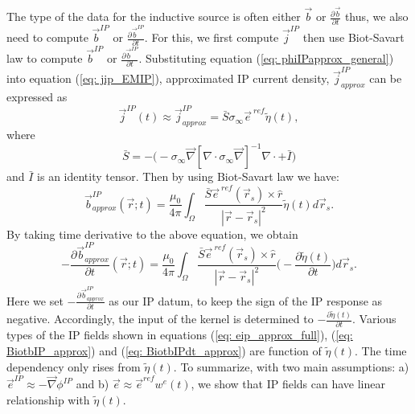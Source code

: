 \documentclass[a4paper, 11pt]{article}
\renewcommand{\div}{\nabla\cdot}
\newcommand{\grad}{\vec \nabla}
\newcommand{\siginf}{\sigma_\infty}
\renewcommand {\j}  { {\vec j} }
\renewcommand {\b}  { {\vec b} }
\newcommand {\e}  { {\vec e} }
\newcommand{\peta}{\tilde{\eta}}
\newcommand{\eref}{\e^{\ ref}}
\begin{document}
The type of the data for the inductive source is often either $\b$ or $\frac{\partial \b}{\partial t}$ thus, we also need to compute $\b^{IP}$ or $\frac{\partial \b^{IP}}{\partial t}$.
For this, we first compute $\j^{IP}$ then use Biot-Savart law to compute $\b^{IP}$ or $\frac{\partial \b^{IP}}{\partial t}$. 
Substituting equation (\ref{eq: phiIPapprox_general}) into equation (\ref{eq: jip_EMIP}), approximated IP current density, $\j^{IP}_{approx}$ can be expressed as
\begin{equation}
  \j^{IP}(t) \approx \j^{IP}_{approx} = \bar{S}\siginf\eref\peta(t),
  \label{eq: jip_approx}
\end{equation}
where
\begin{equation}
  \bar{S} = -\Big(-\siginf\grad[\div \siginf\grad]^{-1}\div+\bar{I}\Big)
\end{equation}
and $\bar{I}$ is an identity tensor. Then by using Biot-Savart law we have:
\begin{equation}
  \b^{IP}_{approx}(\vec{r}; t) = \frac{\mu_0}{4\pi}\int_{\Omega}  \frac{\bar{S}\eref(\vec{r}_s)\times\hat{r}}{|\vec{r}-\vec{r}_s|^2}\peta(t)d\vec{r}_s.
  \label{eq: BiotbIP_approx}
\end{equation}
By taking time derivative to the above equation, we obtain
\begin{equation}
  -\frac{\partial\b^{IP}_{approx}}{\partial t}(\vec{r}; t) = \frac{\mu_0}{4\pi} \int_{\Omega}  \frac{\bar{S}\eref(\vec{r}_s)\times\hat{r}}{|\vec{r}-\vec{r}_s|^2} \Big( -\frac{\partial \peta(t)}{\partial t} \Big) d\vec{r}_s.
  \label{eq: BiotbIPdt_approx}
\end{equation}
Here we set $-\frac{\partial \b^{IP}_{approx}}{\partial t}$ as our IP datum, to keep the sign of the IP response as negative. 
Accordingly, the input of the kernel is determined to $-\frac{\partial \peta(t)}{\partial t}$. 
Various types of the IP fields shown in equations (\ref{eq: eip_approx_full}), (\ref{eq: BiotbIP_approx}) and (\ref{eq: BiotbIPdt_approx}) are function of $\peta(t)$.
The time dependency only rises from $\peta(t)$. 
To summarize, with two main assumptions: a) $\e^{IP}\approx -\grad\phi^{IP}$ and b) $\e \approx \e^{ref}w^e(t)$, we show that IP fields can have linear relationship with $\peta(t)$. 
\end{document}
